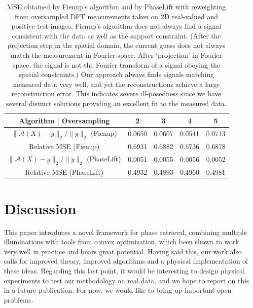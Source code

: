 \documentclass[11pt]{article}
\newcommand{\<}{\langle}
\renewcommand{\>}{\rangle}
\newcommand{\cA}{\mathcal{A}}
\numberwithin{equation}{section}
\begin{document}
\begin{table}[h]
\centering
  \begin{tabular}{|c|c|c|c|c|}
    \hline
    Algorithm $\vert$ Oversampling   & 2      & 3      & 4      & 5      \\
    \hline 
    \hline
    $\|\cA(X) - y\|_2/\|y\|_2$ (Fienup) & 0.0650 & 0.0607 & 0.0541 & 0.0713 \\
    \hline
    Relative MSE (Fienup) & 0.6931 & 0.6882 & 0.6736 & 0.6878 \\
    \hline 
    \hline
    $\|\cA(X) - y\|_2/\|y\|_2$ (PhaseLift) & 0.0051 & 0.0055 & 0.0056 & 0.0052 \\
    \hline
    Relative MSE (PhaseLift)   & 0.4932 & 0.4893 & 0.4960 & 0.4981 \\
    \hline
  \end{tabular}
  \caption{
    MSE obtained by Fienup's algorithm and by PhaseLift with reweighting
    from oversampled DFT measurements 
    taken on 2D real-valued and positive test images. 
    Fienup's algorithm does not always find a signal consistent 
    with the data as well as the support constraint. (After the projection step in the spatial domain, the current guess does not always match the measurement in Fourier space. After `projection' in Fourier space, the signal is not the Fourier transform of a signal obeying the spatial constraints.)
    Our approach always finds signals matching  
    measured data very well, and yet the reconstructions achieve a
    large reconstruction error. This indicates severe ill-posedness 
    since we have several distinct solutions providing an excellent 
    fit to the measured data.}
\label{tab:2C}
\end{table}

\section{Discussion}
\label{sec:discussion}

This paper introduces a novel framework for phase retrieval, combining
multiple illuminations with tools from convex optimization, which
been shown to work very well in practice and bears great
potential. Having said this, our work also calls for improved theory,
improved algorithms and a physical implementation of these
ideas. Regarding this last point, it would be interesting to design
physical experiments to test our methodology on real data, and we hope
to report on this in a future publication. For now, we would like to
bring up important open problems.
\end{document}
